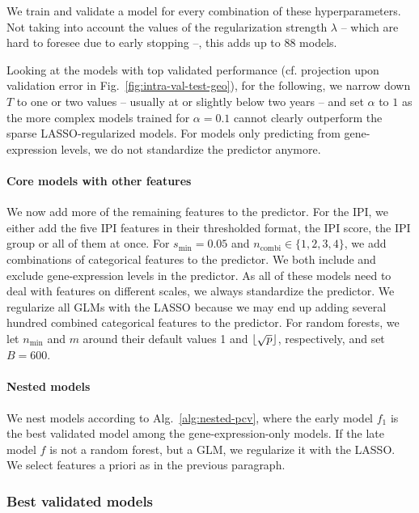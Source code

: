 We train and validate a model for every combination of these hyperparameters.
Not taking into account the values of the regularization strength $\lambda$ -- which are hard to 
foresee due to early stopping --, this adds up to \num{88} models.

Looking at the models with top validated performance (cf. projection upon validation error in Fig.\ 
\ref{fig:intra-val-test-geo}), for the following, we narrow down $T$ to one or 
two values -- usually at or slightly below two years -- and set $\alpha$ to $1$ as the more complex 
models trained for $\alpha = \num{0.1}$ cannot clearly outperform the sparse LASSO-regularized 
models. For models only predicting from gene-expression levels, we do not standardize the predictor 
anymore.

\paragraph{Core models with other features}
We now add more of the remaining features to the predictor. For the 
IPI, we either add the five IPI features in their thresholded format, the IPI score, the IPI group
or all of them at once. For $s_\text{min} = \num{0.05}$ 
and $n_\text{combi} \in \{1, 2, 3, 4 \}$, we add combinations of categorical features to the 
predictor. 
We both include and exclude gene-expression levels in the predictor.
As all of these models need to deal with features on different scales, we always 
standardize the predictor. We regularize all GLMs with the LASSO because we may end up adding 
several hundred combined categorical features to the predictor. For random forests, we let 
$n_\text{min}$ and $m$ around their default values \num{1} and $\lfloor\sqrt{p}\rfloor$, respectively, and 
set $B = \num{600}$.

\paragraph{Nested models}
We nest models according to Alg.\ \ref{alg:nested-pcv}, where the early model $f_1$ is the best 
validated model among the gene-expression-only models. If the late model $f$ is not a random 
forest, but a GLM, we regularize it with the LASSO. We select features a priori as in the previous 
paragraph.

\subsubsection{Best validated models}

